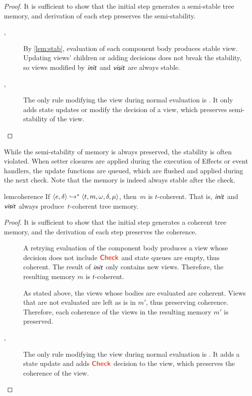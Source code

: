 \begin{proof}
  It is sufficient to show that the initial step generates a semi-stable tree memory, and derivation of each step preserves the semi-stability.
  \begin{description}
    \item[{\normalfont{}, }]
      By \cref{lem:stab}, evaluation of each component body produces stable view.
      Updating views' children or adding decisions does not break the stability, so views modified by $\textsf{\textit{init}}$ and $\textsf{\textit{visit}}$ are always stable.
    \item[{\normalfont{}, }]
      The only rule modifying the view during normal evaluation is .
      It only adds state updates or modify the decision of a view, which preserves semi-stability of the view. \qedhere
  \end{description}
\end{proof}

\begin{remark}
  While the semi-stability of memory is always preserved, the stability is often violated.
  When setter closures are applied during the execution of Effects or event handlers,
  the update functions are queued,
  which are flushed and applied during the next check.
  Note that the memory is indeed always stable after the check.
\end{remark}

\begin{restatable}{lem}{coherence}\label{lem:coherence}
  If $\langle e,\delta\rangle \hookrightarrow^* \langle t,m,\omega,\delta,\mu\rangle$, then~$m$ is $t$-coherent.
  That is, $\textsf{\textit{init}}$ and $\textsf{\textit{visit}}$ always produce~$t$-coherent tree memory.
\end{restatable}

\begin{proof}
  It is sufficient to show that the initial step generates a coherent tree memory, and the derivation of each step preserves the coherence.
  \begin{description}
    \item[{\normalfont{}}]
      A retrying evaluation of the component body produces a view whose decision does not include $\dec{Check}$ and state queues are empty, thus coherent.
      The result of $\textsf{\textit{init}}$ only contains new views.
      Therefore, the resulting memory $m$ is $t$-coherent.
    \item[{\normalfont{}}]
      As stated above, the views whose bodies are evaluated are coherent.
      Views that are not evaluated are left as is in $m'$, thus preserving coherence.
      Therefore, each coherence of the views in the resulting memory $m'$ is preserved.
    \item[{\normalfont{}, }]
      The only rule modifying the view during normal evaluation is . It adds a state update and adds $\dec{Check}$ decision to the view, which preserves the coherence of the view. \qedhere
  \end{description}
\end{proof}



